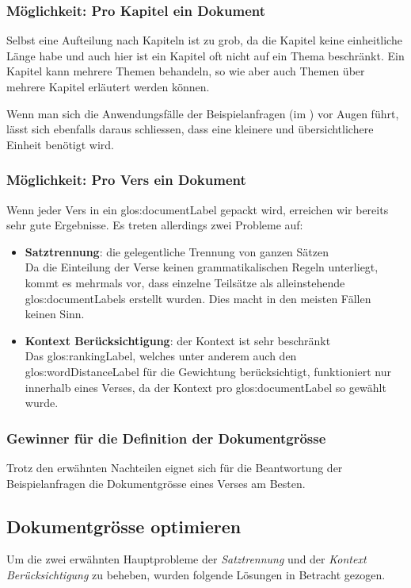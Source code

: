 \subsubsection{Möglichkeit: Pro Kapitel ein Dokument}
Selbst eine Aufteilung nach Kapiteln ist zu grob, da die Kapitel keine einheitliche Länge habe und auch hier ist ein Kapitel oft nicht auf ein Thema beschränkt.
Ein Kapitel kann mehrere Themen behandeln, so wie aber auch Themen über mehrere Kapitel erläutert werden können.

Wenn man sich die Anwendungsfälle der Beispielanfragen (im ) vor Augen führt, lässt sich ebenfalls daraus schliessen, dass eine kleinere und übersichtlichere Einheit benötigt wird.

\subsubsection{Möglichkeit: Pro Vers ein Dokument}
Wenn jeder Vers in ein \gls{glos:documentLabel} gepackt wird, erreichen wir bereits sehr gute Ergebnisse.
Es treten allerdings zwei Probleme auf:
\begin{itemize}[noitemsep]
	\item \textbf{Satztrennung}: die gelegentliche Trennung von ganzen Sätzen\\
	Da die Einteilung der Verse keinen grammatikalischen Regeln unterliegt, kommt es mehrmals vor, dass einzelne Teilsätze als alleinstehende \glspl{glos:documentLabel} erstellt wurden. Dies macht in den meisten Fällen keinen Sinn.
	\item \textbf{Kontext Berücksichtigung}: der Kontext ist sehr beschränkt\\
	Das \gls{glos:rankingLabel}, welches unter anderem auch den \gls{glos:wordDistanceLabel} für die Gewichtung berücksichtigt, funktioniert nur innerhalb eines Verses, da der Kontext pro \gls{glos:documentLabel} so gewählt wurde.
\end{itemize}

\subsubsection{Gewinner für die Definition der Dokumentgrösse}
Trotz den erwähnten Nachteilen eignet sich für die Beantwortung der Beispielanfragen die Dokumentgrösse eines Verses am Besten.


\subsection{Dokumentgrösse optimieren}
\label{sec:documentOptimazing}
Um die zwei erwähnten Hauptprobleme der \textit{Satztrennung} und der \textit{Kontext Berücksichtigung} zu beheben, wurden folgende Lösungen in Betracht gezogen.

